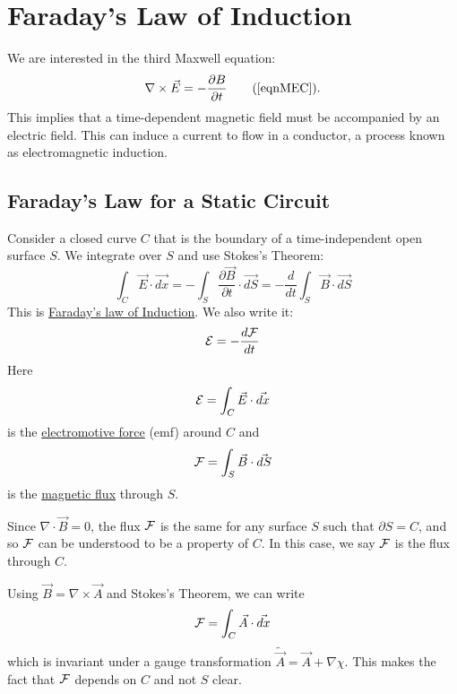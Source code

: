 \documentclass[../Main.tex]{subfiles}
\begin{document}
\section{Faraday's Law of Induction}
We are interested in the third Maxwell equation:
\begin{equation*}
    \nabla \times \vec{E} = -\frac{\partial B}{\partial t} \tag{\ref{eqnMEC}}.
\end{equation*}
This implies that a time-dependent magnetic field must be accompanied by an electric field. This can induce a current to flow in a conductor, a process known as electromagnetic induction.
\subsection{Faraday's Law for a Static Circuit}
Consider a closed curve $C$ that is the boundary of a time-independent open surface $S$. We integrate  over $S$ and use Stokes's Theorem:
\begin{equation*}
    \int_C \vec{E} \cdot \vec{dx} = -\int_S \frac{\partial \vec{B}}{\partial t} \cdot \vec{dS} = - \frac{d}{dt} \int_S \vec{B} \cdot \vec{dS}
\end{equation*}
This is \underline{Faraday's law of Induction}. We also write it:
\begin{equation*}
    \mathcal{E} = -\frac{d\mathcal{F}}{dt}
\end{equation*}
Here
\begin{equation*}
    \mathcal{E} = \int_C \vec{E} \cdot \vec{dx}
\end{equation*}
is the \underline{electromotive force} (emf) around $C$ and
\begin{equation*}
    \mathcal{F} = \int_S \vec{B} \cdot \vec{dS}
\end{equation*}
is the \underline{magnetic flux} through $S$.

Since $\nabla \cdot \vec{B} = 0$, the flux $\mathcal{F}$ is the same for any surface $S$ such that $\partial S = C$, and so $\mathcal{F}$ can be understood to be a property of $C$. In this case, we say $\mathcal{F}$ is the flux through $C$.

Using $\vec{B} = \nabla \times \vec{A}$ and Stokes's Theorem, we can write
\begin{equation*}
    \mathcal{F} = \int_C \vec{A} \cdot \vec{dx}
\end{equation*}
which is invariant under a gauge transformation $\tilde{\vec{A}} = \vec{A} + \nabla \chi$. This makes the fact that $\mathcal{F}$ depends on $C$ and not $S$ clear.
\end{document}
